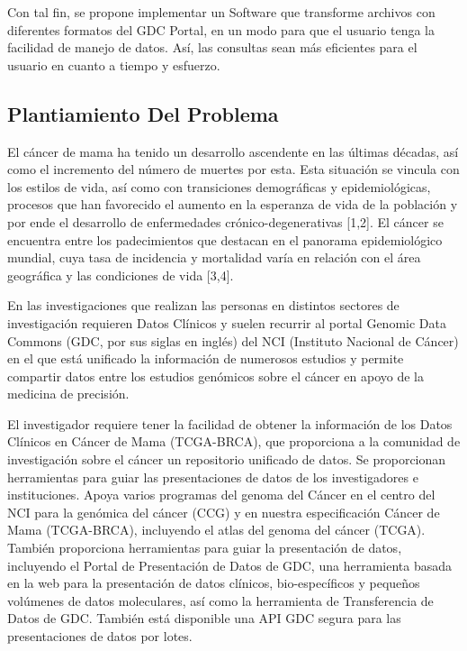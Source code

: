 \documentclass[10pt,a4paper]{article}
\begin{document}
Con tal fin, se propone implementar un Software que transforme archivos con diferentes formatos del GDC Portal, en un modo para que el usuario tenga la facilidad de manejo de datos. As\'i, las consultas sean m\'as eficientes para el usuario en cuanto a tiempo y esfuerzo.

\subsection{Plantiamiento Del Problema}

El c\'ancer de mama ha tenido un desarrollo ascendente en las \'ultimas d\'ecadas, as\'i como el incremento del n\'umero de muertes por esta. Esta situaci\'on se vincula con los estilos de vida, as\'i como con transiciones demogr\'aficas y epidemiol\'ogicas, procesos que han favorecido el aumento en la esperanza de vida de la poblaci\'on y por ende el desarrollo de enfermedades cr\'onico-degenerativas [1,2]. El c\'ancer se encuentra entre los padecimientos que destacan en el panorama epidemiol\'ogico mundial, cuya tasa de incidencia y mortalidad varía en relaci\'on con el \'area geogr\'afica y las condiciones de vida [3,4].

En las investigaciones que realizan las personas en distintos sectores de investigaci\'on requieren Datos Cl\'inicos y suelen recurrir al portal Genomic Data Commons (GDC, por sus siglas en ingl\'es) del NCI (Instituto Nacional de C\'ancer) en el que est\'a unificado la informaci\'on de numerosos estudios y permite compartir datos entre los estudios gen\'omicos sobre el c\'ancer en apoyo de la medicina de precisi\'on.

El investigador requiere tener la facilidad de obtener la informaci\'on de los Datos Cl\'inicos en C\'ancer de Mama (TCGA-BRCA), que proporciona a la comunidad de investigaci\'on sobre el c\'ancer un repositorio unificado de datos. Se proporcionan herramientas para guiar las presentaciones de datos de los investigadores e instituciones. Apoya varios programas del genoma del C\'ancer en el centro del NCI para la gen\'omica del c\'ancer (CCG) y en nuestra especificaci\'on C\'ancer de Mama (TCGA-BRCA), incluyendo el atlas del genoma del c\'ancer (TCGA). Tambi\'en proporciona herramientas para guiar la presentaci\'on de datos, incluyendo el Portal de Presentaci\'on de Datos de GDC, una herramienta basada en la web para la presentaci\'on de datos cl\'inicos, bio-espec\'ificos y peque\~nos vol\'umenes de datos moleculares, as\'i como la herramienta de Transferencia de Datos de GDC. Tambi\'en est\'a disponible una API GDC segura para las presentaciones de datos por lotes.
\end{document}
